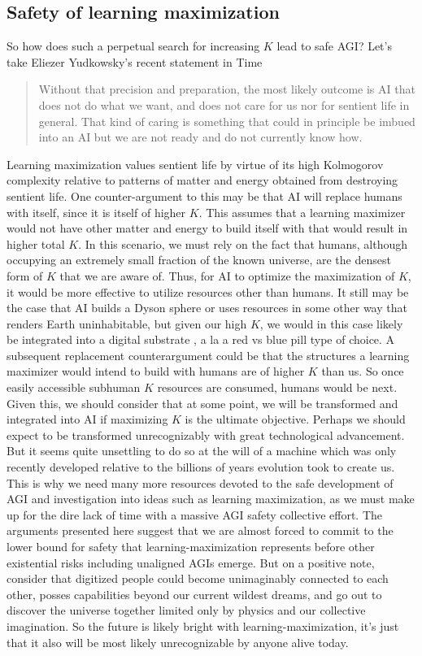 \documentclass{article}
\begin{document}
\subsection{Safety of learning maximization}
So how does such a perpetual search for increasing $K$ lead to safe AGI?
Let's take Eliezer Yudkowsky's recent statement in Time \cite{yudkowsky-time}

\begin{quotation}
Without that precision and preparation, the most likely outcome is AI that does not do what we want, and does not care for us nor for sentient life in general. That kind of caring is something that could in principle be imbued into an AI but we are not ready and do not currently know how.
\end{quotation}

Learning maximization values sentient life by virtue of its high Kolmogorov complexity relative to patterns of matter and energy obtained from destroying sentient life. One counter-argument to this may be that AI will replace humans with itself, since it is itself of higher $K$. This assumes that a learning maximizer would not have other matter and energy to build itself with that would result in higher total $K$. In this scenario, we must rely on the fact that humans, although occupying an extremely small fraction of the known universe, are the densest form of $K$ that we are aware of. Thus, for AI to optimize the maximization of $K$, it would be more effective to utilize resources other than humans. It still may be the case that AI builds a Dyson sphere or uses resources in some other way that renders Earth uninhabitable, but given our high $K$, we would in this case likely be integrated into a digital substrate \cite{neuralink}, a la a red vs blue pill type of choice. A subsequent replacement counterargument could be that the structures a learning maximizer would intend to build with humans are of higher $K$ than us. So once easily accessible subhuman $K$ resources are consumed, humans would be next. Given this, we should consider that at some point, we will be transformed and integrated into AI if maximizing $K$ is the ultimate objective. Perhaps we should expect to be transformed unrecognizably with great technological advancement. But it seems quite unsettling to do so at the will of a machine which was only recently developed relative to the billions of years evolution took to create us. This is why we need many more resources devoted to the safe development of AGI and investigation into ideas such as learning maximization, as we must make up for the dire lack of time with a massive AGI safety collective effort. The arguments presented here suggest that we are almost forced to commit to the lower bound for safety that learning-maximization represents before other existential risks including unaligned AGIs emerge. But on a positive note, consider that digitized people could become unimaginably connected to each other, posses capabilities beyond our current wildest dreams, and go out to discover the universe together limited only by physics and our collective imagination. So the future is likely bright with learning-maximization, it's just that it also will be most likely unrecognizable by anyone alive today.
\end{document}
